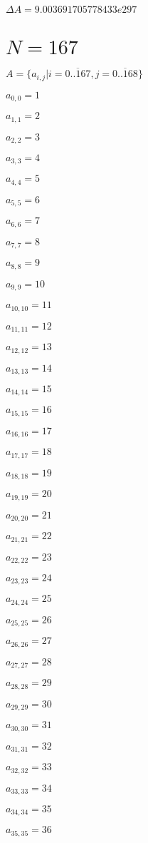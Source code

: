 \documentclass[a4paper,12pt]{article}
\begin{document}
$\Delta A = 9.003691705778433e297$



\section{ $N = 167$ }
$A = \{ a _{ i, j } | i = \overline { 0..167 }, j = \overline { 0..168 } \}$

$a _{ 0, 0 } = 1$

$a _{ 1, 1 } = 2$

$a _{ 2, 2 } = 3$

$a _{ 3, 3 } = 4$

$a _{ 4, 4 } = 5$

$a _{ 5, 5 } = 6$

$a _{ 6, 6 } = 7$

$a _{ 7, 7 } = 8$

$a _{ 8, 8 } = 9$

$a _{ 9, 9 } = 10$

$a _{ 10, 10 } = 11$

$a _{ 11, 11 } = 12$

$a _{ 12, 12 } = 13$

$a _{ 13, 13 } = 14$

$a _{ 14, 14 } = 15$

$a _{ 15, 15 } = 16$

$a _{ 16, 16 } = 17$

$a _{ 17, 17 } = 18$

$a _{ 18, 18 } = 19$

$a _{ 19, 19 } = 20$

$a _{ 20, 20 } = 21$

$a _{ 21, 21 } = 22$

$a _{ 22, 22 } = 23$

$a _{ 23, 23 } = 24$

$a _{ 24, 24 } = 25$

$a _{ 25, 25 } = 26$

$a _{ 26, 26 } = 27$

$a _{ 27, 27 } = 28$

$a _{ 28, 28 } = 29$

$a _{ 29, 29 } = 30$

$a _{ 30, 30 } = 31$

$a _{ 31, 31 } = 32$

$a _{ 32, 32 } = 33$

$a _{ 33, 33 } = 34$

$a _{ 34, 34 } = 35$

$a _{ 35, 35 } = 36$
\end{document}
